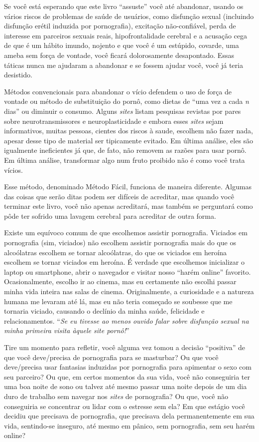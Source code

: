 \documentclass[
  spanish,
  openany]{book}
\begin{document}
Se você está esperando que este livro ``assuste'' você até abandonar, usando os vários riscos de problemas de saúde de usuários, como disfunção sexual (incluindo disfunção erétil induzida por pornografia), excitação não-confiável, perda de interesse em parceiros sexuais reais, hipofrontalidade cerebral e a acusação cega de que é um hábito imundo, nojento e que você é um estúpido, covarde, uma ameba sem força de vontade, você ficará dolorosamente desapontado. Essas táticas nunca me ajudaram a abandonar e se fossem ajudar você, você já teria desistido.

Métodos convencionais para abandonar o vício defendem o uso de força de vontade ou método de substituição do pornô, como dietas de ``uma vez a cada \emph{n} dias'' ou diminuir o consumo. Alguns \emph{sites} listam pesquisas revistas por pares sobre neurotransmissores e neuroplasticidade e embora esses \emph{sites} sejam informativos, muitas pessoas, cientes dos riscos à saude, escolhem não fazer nada, apesar desse tipo de material ser tipicamente evitado. Em última análise, eles são igualmente ineficientes já que, de fato, não removem as razões para usar pornô. Em última análise, transformar algo num fruto proibido não é como você trata vícios.

Esse método, denominado Método Fácil, funciona de maneira diferente. Algumas das coisas que serão ditas podem ser difíceis de acreditar, mas quando você terminar este livro, você não apenas acreditará, mas também se perguntará como pôde ter sofrido uma lavagem cerebral para acreditar de outra forma.

Existe um equívoco comum de que escolhemos assistir pornografia. Viciados em pornografia (sim, viciados) não escolhem assistir pornografia mais do que os alcoólatras escolhem se tornar alcoólatras, do que os viciados em heroína escolhem se tornar viciados em heroína. É verdade que escolhemos inicializar o laptop ou smartphone, abrir o navegador e visitar nosso ``harém online'' favorito. Ocasionalmente, escolho ir ao cinema, mas eu certamente não escolhi passar minha vida inteira nas salas de cinema. Originalmente, a curiosidade e a natureza humana me levaram até lá, mas eu não teria começado se soubesse que me tornaria viciado, causando o declínio da minha saúde, felicidade e relacionamentos. ``\emph{Se eu tivesse ao menos ouvido falar sobre disfunção sexual na minha primeira visita àquele site pornô!}''

Tire um momento para refletir, você alguma vez tomou a decisão ``positiva'' de que você deve/precisa de pornografia para se masturbar? Ou que você deve/precisa usar fantasias induzidas por pornografia para apimentar o sexo com seu parceiro? Ou que, em certos momentos da sua vida, você não conseguiria ter uma boa noite de sono ou talvez até mesmo passar uma noite depois de um dia duro de trabalho sem navegar nos \emph{sites} de pornografia? Ou que, você não conseguiria se concentrar ou lidar com o estresse sem ela? Em que estágio você decidiu que precisava de pornografia, que precisava dela permanentemente em sua vida, sentindo-se inseguro, até mesmo em pânico, sem pornografia, sem seu harém online?
\end{document}

